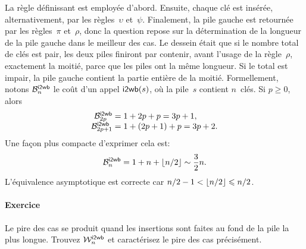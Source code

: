 La règle définissant  est employée d'abord. Ensuite, chaque
clé est insérée, alternativement, par les règles~\(\upsilon\)
et~\(\psi\). Finalement, la pile gauche est retournée par les
règles~\(\pi\) et~\(\rho\), donc la question repose sur la
détermination de la longueur de la pile gauche dans le meilleur des
cas. Le dessein était que si le nombre total de clés est pair, les
deux piles finiront par contenir, avant l'usage de la règle~\(\rho\),
exactement la moitié, parce que les piles ont la même longueur. Si le
total est impair, la pile gauche contient la partie entière de la
moitié. Formellement, notons \(\B{\fun{i2wb}}{n}\) le coût d'un appel
\(\fun{i2wb}(s)\), où la pile~\(s\) contient \(n\)~clés. Si \(p
\geqslant 0\), alors
\begin{equation*}
\begin{array}{@{}r@{\;}c@{\;}l@{}}
\B{\fun{i2wb}}{2p}   & = & 1 +     2p + p = 3p + 1,\\
\B{\fun{i2wb}}{2p+1} & = & 1 + (2p+1) + p = 3p + 2.
\end{array}
\end{equation*}
Une façon plus compacte d'exprimer cela est:
\begin{equation*}
  \B{\fun{i2wb}}{n} = 1 + n + \floor{n/2} \sim \frac{3}{2}{n}.
\end{equation*}
L'équivalence asymptotique est correcte car \(n/2-1 < \floor{n/2}
\leqslant n/2\).

\paragraph{Exercice}

Le pire des cas se produit quand les insertions sont faites au fond de
la pile la plus longue. Trouvez \(\W{\fun{i2wb}}{n}\) et caractérisez
le pire des cas précisément.


